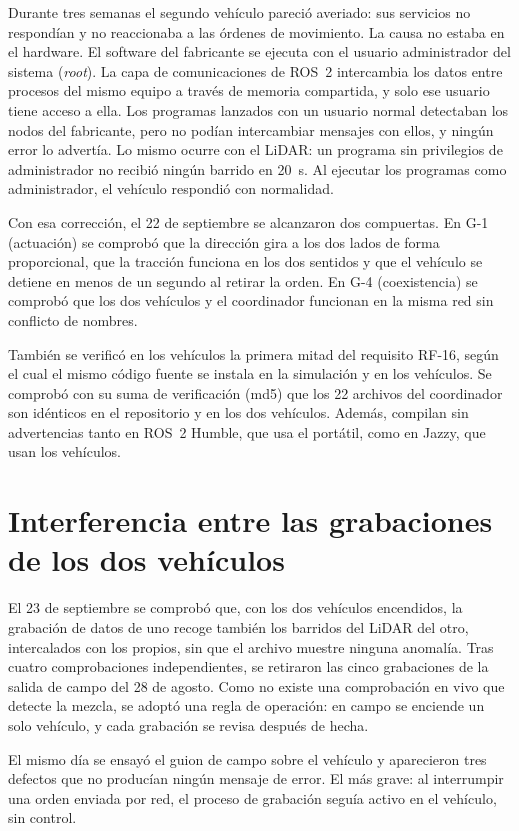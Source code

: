 \documentclass[12pt,letterpaper]{article}
\begin{document}
Durante tres semanas el segundo vehículo pareció averiado: sus servicios no respondían y no reaccionaba a las órdenes de movimiento. La causa no estaba en el hardware. El software del fabricante se ejecuta con el usuario administrador del sistema (\textit{root}). La capa de comunicaciones de ROS~2 intercambia los datos entre procesos del mismo equipo a través de memoria compartida, y solo ese usuario tiene acceso a ella. Los programas lanzados con un usuario normal detectaban los nodos del fabricante, pero no podían intercambiar mensajes con ellos, y ningún error lo advertía. Lo mismo ocurre con el LiDAR: un programa sin privilegios de administrador no recibió ningún barrido en 20~s. Al ejecutar los programas como administrador, el vehículo respondió con normalidad.

Con esa corrección, el 22 de septiembre se alcanzaron dos compuertas. En G-1 (actuación) se comprobó que la dirección gira a los dos lados de forma proporcional, que la tracción funciona en los dos sentidos y que el vehículo se detiene en menos de un segundo al retirar la orden. En G-4 (coexistencia) se comprobó que los dos vehículos y el coordinador funcionan en la misma red sin conflicto de nombres.

También se verificó en los vehículos la primera mitad del requisito RF-16, según el cual el mismo código fuente se instala en la simulación y en los vehículos. Se comprobó con su suma de verificación (md5) que los 22 archivos del coordinador son idénticos en el repositorio y en los dos vehículos. Además, compilan sin advertencias tanto en ROS~2 Humble, que usa el portátil, como en Jazzy, que usan los vehículos.

\section{Interferencia entre las grabaciones de los dos vehículos}

El 23 de septiembre se comprobó que, con los dos vehículos encendidos, la grabación de datos de uno recoge también los barridos del LiDAR del otro, intercalados con los propios, sin que el archivo muestre ninguna anomalía. Tras cuatro comprobaciones independientes, se retiraron las cinco grabaciones de la salida de campo del 28 de agosto. Como no existe una comprobación en vivo que detecte la mezcla, se adoptó una regla de operación: en campo se enciende un solo vehículo, y cada grabación se revisa después de hecha.

El mismo día se ensayó el guion de campo sobre el vehículo y aparecieron tres defectos que no producían ningún mensaje de error. El más grave: al interrumpir una orden enviada por red, el proceso de grabación seguía activo en el vehículo, sin control.
\end{document}
